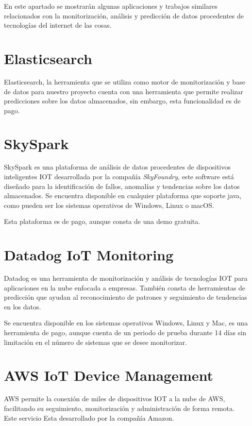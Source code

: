 

En este apartado se mostrarán algunas aplicaciones y trabajos similares relacionados con la monitorización, análisis y predicción de datos procedentes de tecnologías del internet de las cosas.


\section{Elasticsearch}

Elasticsearch, la herramienta que se utiliza como motor de monitorización y base de datos para nuestro proyecto cuenta con una herramienta que permite realizar predicciones sobre los datos almacenados, sin embargo, esta funcionalidad es de pago.

\section{SkySpark}
SkySpark es una plataforma de análisis de datos procedentes de dispositivos inteligentes IOT desarrollada por la compañía \textit{SkyFoundry}, este software está diseñado para la identificación de fallos, anomalías y tendencias sobre los datos almacenados. Se encuentra disponible en cualquier plataforma que soporte java, como pueden ser los sistemas operativos de Windows, Linux o macOS. 

Esta plataforma es de pago, aunque consta de una demo gratuita. \cite{pagina:SkySpark} 


\section{Datadog IoT Monitoring}

Datadog es una herramienta de monitorización y análisis de tecnologías IOT para aplicaciones en la nube enfocada a empresas. También consta de herramientas de predicción que ayudan al reconocimiento de patrones y seguimiento de tendencias en los datos.

Se encuentra disponible en los sistemas operativos Windows, Linux y Mac, es una herramienta de pago, aunque cuenta de un periodo de prueba durante 14 días sin limitación en el número de sistemas que se desee monitorizar.\cite{pagina:DataDog}


\section{AWS IoT Device Management}

AWS permite la conexión de miles de dispositivos IOT a la nube de AWS, facilitando su seguimiento, monitorización y administración de forma remota. Este servicio Esta desarrollado por la compañía Amazon. \cite{pagina:AWS}
